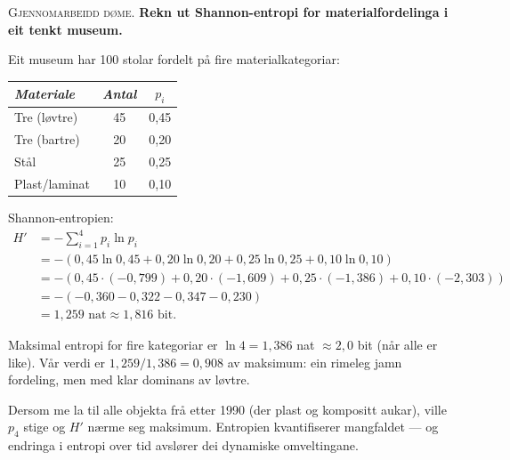 \documentclass[10pt]{book}
\theoremstyle{definition}
\theoremstyle{plain}
\theoremstyle{remark}
\newenvironment{gjennomgang}%
  {\medskip\noindent\textsc{Gjennomarbeidd d\o me.}\enspace}%
  {\medskip}
\begin{document}
\begin{gjennomgang}
\textbf{Rekn ut Shannon-entropi for materialfordelinga i eit tenkt museum.}

Eit museum har 100 stolar fordelt p\aa{} fire materialkategoriar:
\begin{center}
\begin{tabular}{lcc}
\textit{Materiale} & \textit{Antal} & $p_i$ \\
\hline
Tre (l\o vtre)  & 45 & 0{,}45 \\
Tre (bartre)    & 20 & 0{,}20 \\
St\aa l          & 25 & 0{,}25 \\
Plast/laminat   & 10 & 0{,}10 \\
\end{tabular}
\end{center}

Shannon-entropien:
\begin{align*}
  H' &= -\sum_{i=1}^{4} p_i \ln p_i \\
     &= -(0{,}45 \ln 0{,}45 + 0{,}20 \ln 0{,}20 + 0{,}25 \ln 0{,}25 + 0{,}10 \ln 0{,}10) \\
     &= -(0{,}45 \cdot (-0{,}799) + 0{,}20 \cdot (-1{,}609) + 0{,}25 \cdot (-1{,}386) + 0{,}10 \cdot (-2{,}303)) \\
     &= -(- 0{,}360 - 0{,}322 - 0{,}347 - 0{,}230) \\
     &= 1{,}259 \text{ nat} \approx 1{,}816 \text{ bit}.
\end{align*}

Maksimal entropi for fire kategoriar er $\ln 4 = 1{,}386$ nat $\approx 2{,}0$ bit (n\aa r alle er like). V\aa r verdi er $1{,}259 / 1{,}386 = 0{,}908$ av maksimum: ein rimeleg jamn fordeling, men med klar dominans av l\o vtre.

Dersom me la til alle objekta fr\aa{} etter 1990 (der plast og kompositt aukar), ville $p_4$ stige og $H'$ n\ae rme seg maksimum. Entropien kvantifiserer mangfaldet --- og endringa i entropi over tid avsl\o rer dei dynamiske omveltingane.
\end{gjennomgang}
\end{document}
